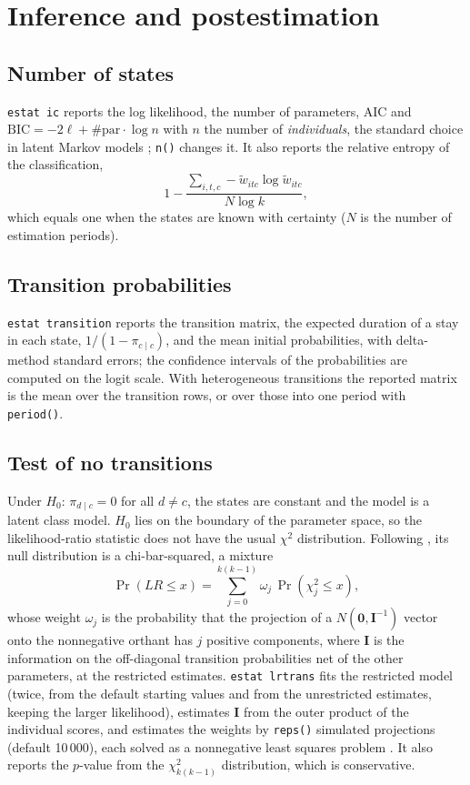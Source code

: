\documentclass[11pt,a4paper]{article}
\newcommand{\cmd}[1]{\texttt{#1}}
\begin{document}
\section{Inference and postestimation}\label{sec:post}

\subsection{Number of states}

\cmd{estat ic} reports the log likelihood, the number of parameters, AIC and
$\mathrm{BIC}=-2\ell+\#\text{par}\cdot\log n$ with $n$ the number of \emph{individuals}, the standard
choice in latent Markov models \citep{bartolucci2013}; \cmd{n()} changes it. It also reports the
relative entropy of the classification,
\[
1-\frac{\sum_{i,t,c}-\tilde w_{itc}\log\tilde w_{itc}}{N\log k},
\]
which equals one when the states are known with certainty ($N$ is the number of estimation periods).

\subsection{Transition probabilities}

\cmd{estat transition} reports the transition matrix, the expected duration of a stay in each state,
$1/(1-\pi_{c\mid c})$, and the mean initial probabilities, with delta-method standard errors; the
confidence intervals of the probabilities are computed on the logit scale. With heterogeneous
transitions the reported matrix is the mean over the transition rows, or over those into one period
with \cmd{period()}.

\subsection{Test of no transitions}

Under $H_0$: $\pi_{d\mid c}=0$ for all $d\ne c$, the states are constant and the model is a latent
class model. $H_0$ lies on the boundary of the parameter space, so the likelihood-ratio statistic does
not have the usual $\chi^2$ distribution. Following \citet{bartolucci2006}, its null distribution is a
chi-bar-squared, a mixture
\[
\Pr(LR\le x)=\sum_{j=0}^{k(k-1)}\omega_j\,\Pr(\chi^2_j\le x),
\]
whose weight $\omega_j$ is the probability that the projection of a $N(\mathbf 0,\mathbf I^{-1})$
vector onto the nonnegative orthant has $j$ positive components, where $\mathbf I$ is the information
on the off-diagonal transition probabilities net of the other parameters, at the restricted estimates.
\cmd{estat lrtrans} fits the restricted model (twice, from the default starting values and from the
unrestricted estimates, keeping the larger likelihood), estimates $\mathbf I$ from the outer product of
the individual scores, and estimates the weights by \cmd{reps()} simulated projections (default
10\,000), each solved as a nonnegative least squares problem \citep{lawson1974}. It also reports the
$p$-value from the $\chi^2_{k(k-1)}$ distribution, which is conservative.
\end{document}
